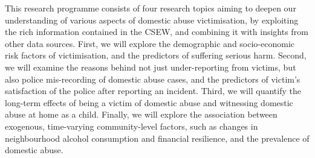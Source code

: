 \documentclass[11pt, a4paper]{article}
\begin{document}



This research programme consists of four research topics aiming to deepen our understanding of various aspects of domestic abuse victimisation, by exploiting the rich information contained in the CSEW, and combining it with insights from other data sources. First, we will explore the demographic and socio-economic risk factors of victimisation, and the predictors of suffering serious harm. Second, we will examine the reasons behind not just under-reporting from victims, but also police mis-recording of domestic abuse cases, and the predictors of victim's satisfaction of the police after reporting an incident. Third, we will quantify the long-term effects of being a victim of domestic abuse and witnessing domestic abuse at home as a child. Finally, we will explore the association between exogenous, time-varying community-level factors, such as changes in neighbourhood alcohol consumption and financial resilience, and the prevalence of domestic abuse.
\end{document}
